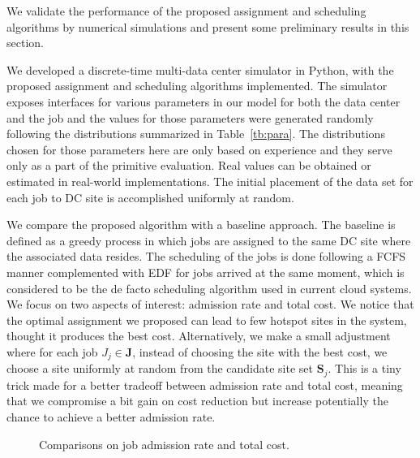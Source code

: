 \documentclass{article}
\begin{document}
We validate the performance of the proposed assignment and scheduling algorithms by numerical simulations and present some preliminary results in this section.

We developed a discrete-time multi-data center simulator in Python, with the proposed assignment and scheduling algorithms implemented. The simulator exposes interfaces for various parameters in our model for both the data center and the job and the values for those parameters were generated randomly following the distributions summarized in Table~\ref{tb:para}. The distributions chosen for those parameters here are only based on experience and they serve only as a part of the primitive evaluation. Real values can be obtained or estimated in real-world implementations. The initial placement of the data set for each job to DC site is accomplished uniformly at random. 

We compare the proposed algorithm with a baseline approach. The baseline is defined as a greedy process in which jobs are assigned to the same DC site where the associated data resides. The scheduling of the jobs is done following a FCFS manner complemented with EDF for jobs arrived at the same moment, which is considered to be the de facto scheduling algorithm used in current cloud systems. We focus on two aspects of interest: admission rate and total cost. We notice that the optimal assignment we proposed can lead to few hotspot sites in the system, thought it produces the best cost. Alternatively, we make a small adjustment where for each job $J_j \in \mathbf{J}$, instead of choosing the site with the best cost, we choose a site uniformly at random from the candidate site set $\mathbf{S}_j$. This is a tiny trick made for a better tradeoff between admission rate and total cost, meaning that we compromise a bit gain on cost reduction but increase potentially the chance to achieve a better admission rate.

\begin{figure}[t!]
    \centering
    \hspace{0.7cm}
    \caption{\label{fig:results}Comparisons on job admission rate and total cost.}
\end{figure}
\end{document}
